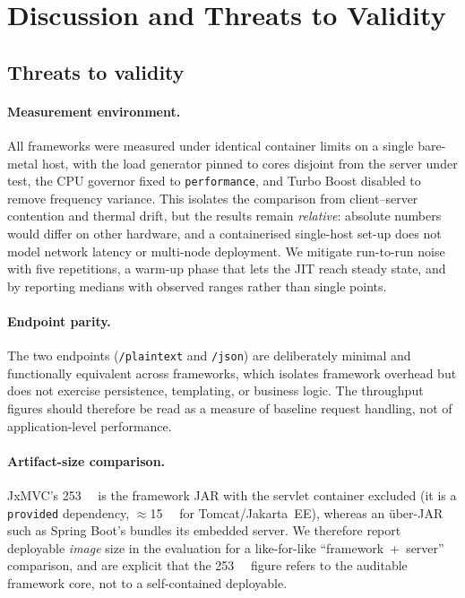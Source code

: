 \section{Discussion and Threats to Validity}\label{sec:threats}

\subsection{Threats to validity}

\paragraph{Measurement environment.} All frameworks were measured under
identical container limits on a single bare-metal host, with the load
generator pinned to cores disjoint from the server under test, the CPU
governor fixed to \texttt{performance}, and Turbo Boost disabled to
remove frequency variance. This isolates the comparison from
client--server contention and thermal drift, but the results remain
\emph{relative}: absolute numbers would differ on other hardware, and a
containerised single-host set-up does not model network latency or
multi-node deployment. We mitigate run-to-run noise with five
repetitions, a warm-up phase that lets the JIT reach steady state, and
by reporting medians with observed ranges rather than single points.

\paragraph{Endpoint parity.} The two endpoints (\texttt{/plaintext} and
\texttt{/json}) are deliberately minimal and functionally equivalent
across frameworks, which isolates framework overhead but does not
exercise persistence, templating, or business logic. The throughput
figures should therefore be read as a measure of baseline request
handling, not of application-level performance.

\paragraph{Artifact-size comparison.} JxMVC's \SI{253}{\kilo\byte} is
the framework JAR with the servlet container excluded (it is a
\texttt{provided} dependency, \(\approx\)\SI{15}{\mega\byte} for
Tomcat/Jakarta~EE), whereas an über-JAR such as Spring Boot's bundles
its embedded server. We therefore report deployable \emph{image} size
in the evaluation for a like-for-like ``framework~+~server''
comparison, and are explicit that the \SI{253}{\kilo\byte} figure
refers to the auditable framework core, not to a self-contained
deployable.

